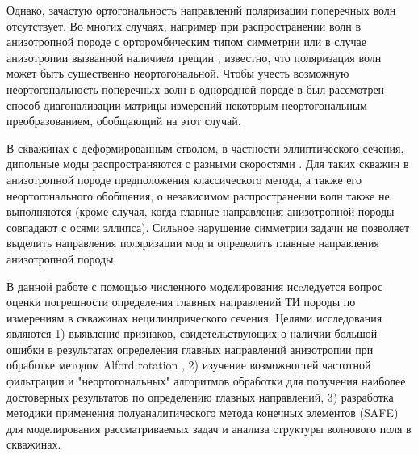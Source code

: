 \documentclass[a4paper,11pt]{article}
\begin{document}
Однако, зачастую ортогональность направлений поляризации поперечных волн отсутствует. Во многих случаях, например при распространении волн в анизотропной породе с орторомбическим типом симметрии \cite{Dellinger2001} или в случае анизотропии вызванной наличием трещин \cite{Nolte1996}, известно, что поляризация волн может быть существенно неортогональной.
Чтобы учесть возможную неортогональность поперечных волн в однородной породе в \cite{Dellinger1998} был рассмотрен способ диагонализации матрицы измерений некоторым неортогональным преобразованием, обобщающий \cite{Alford1986} на этот случай. %

В скважинах с деформированным стволом, в частности эллиптического сечения, дипольные моды распространяются с разными скоростями \cite{Seroices2010}. Для таких скважин в анизотропной породе предположения классического метода, а также его неортогонального обобщения, о независимом распространении волн также не выполняются (кроме случая, когда главные направления анизотропной породы совпадают с осями эллипса). Сильное нарушение симметрии задачи не позволяет выделить направления поляризации мод и определить главные направления анизотропной породы. 

В данной работе с помощью численного моделирования исcледуется вопрос оценки погрешности определения главных направлений ТИ породы по измерениям в скважинах нецилиндрического сечения. Целями исследования являются 1) выявление признаков, свидетельствующих о наличии большой ошибки в результатах определения главных направлений анизотропии при обработке методом Alford rotation%
, 2) изучение возможностей частотной фильтрации и "неортогональных" алгоритмов обработки для получения наиболее достоверных результатов по определению главных направлений, 3) разработка методики применения полуаналитического метода конечных элементов (SAFE) \cite{Bartoli2006} для моделирования рассматриваемых задач и анализа структуры волнового поля в скважинах. %
\end{document}
